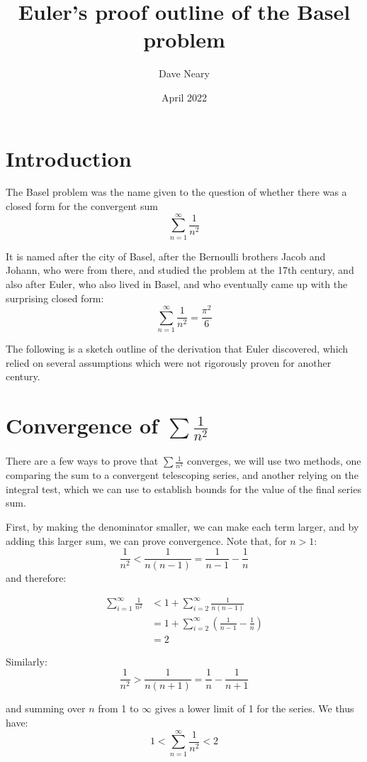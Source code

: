 \documentclass{article}
\title{Euler's proof outline of the Basel problem}
\author{Dave Neary}
\date{April 2022}
\begin{document}
\maketitle

\section{Introduction}

The Basel problem was the name given to the question of whether there was a closed form for the convergent sum
\[ \sum_{n=1}^{\infty} \frac{1}{n^2} \]

It is named after the city of Basel, after the Bernoulli brothers Jacob and Johann, who were from there, and studied the problem at the 17th century, and also after Euler, who also lived in Basel, and who eventually came up with the surprising closed form:
\[ \sum_{n=1}^{\infty} \frac{1}{n^2}  = \frac{\pi^2}{6} \]

The following is a sketch outline of the derivation that Euler discovered, which relied on several assumptions which were not rigorously proven for another century.

\section{Convergence of $\sum \frac{1}{n^2}$}

There are a few ways to prove that $\sum \frac{1}{n^2}$ converges, we will use two methods, one
comparing the sum to a convergent telescoping series, and another relying on the integral test, which
we can use to establish bounds for the value of the final series sum.

First, by making the denominator smaller, we can make each term larger, and by adding this larger sum,
we can prove convergence. Note that, for $n>1$:
\[ \frac{1}{n^2} < \frac{1}{n(n-1)} = \frac{1}{n-1} - \frac{1}{n} \]
and therefore:

\begin{align*}
     \sum_{i=1}^{\infty} \frac{1}{n^2} &< 1 + \sum_{i=2}^{\infty} \frac{1}{n(n-1)} \\
     &= 1 + \sum_{i=2}^{\infty} \left(\frac{1}{n-1} - \frac{1}{n} \right) \\
     &= 2
\end{align*}

Similarly:
\[ \frac{1}{n^2} > \frac{1}{n(n+1)} = \frac{1}{n} - \frac{1}{n+1} \]

and summing over $n$ from 1 to $\infty$ gives a lower limit of 1 for the series. We thus have:
\[ 1 < \sum_{n=1}^{\infty} \frac{1}{n^2} < 2 \]
\end{document}
